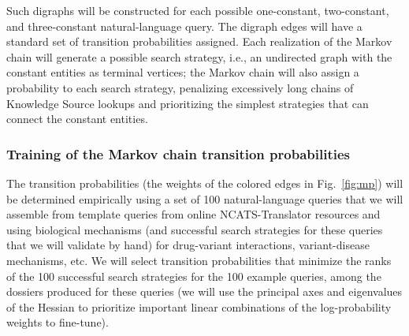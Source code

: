 \documentclass[11pt,notitlepage]{article}
\begin{document}
Such digraphs will be constructed for each possible one-constant, two-constant,
and three-constant natural-language query. The digraph edges will have a
standard set of transition probabilities assigned. Each realization of the
Markov chain will generate a possible search strategy, i.e., an undirected graph
with the constant entities as terminal vertices; the Markov chain will also
assign a probability to each search strategy, penalizing excessively long chains
of Knowledge Source lookups and prioritizing the simplest strategies that can
connect the constant entities.

\subsubsection{Training of the Markov chain transition probabilities}
The transition probabilities (the weights of the
colored edges in Fig.~\ref{fig:mp}) will be determined empirically using a set
of 100 natural-language queries that we will assemble from template queries from
online NCATS-Translator resources and using biological mechanisms (and
successful search strategies for these queries that we will validate by hand)
for drug-variant interactions, variant-disease mechanisms, etc. We will select
transition probabilities that minimize the ranks of the 100 successful search
strategies for the 100 example queries, among the dossiers produced for these
queries (we will use the principal axes and eigenvalues of the Hessian to
prioritize important linear combinations of the log-probability weights to
fine-tune).
\end{document}
